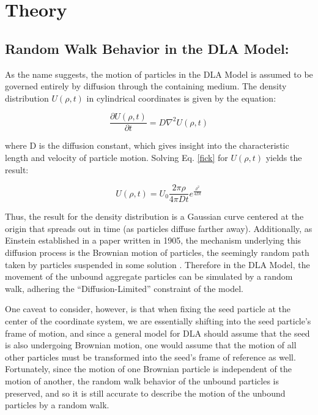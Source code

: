 \documentclass{article}
\begin{document}
 

\section{Theory}


\subsection{Random Walk Behavior in the DLA Model:}

As the name suggests, the motion of particles in the DLA Model is assumed to be governed entirely by diffusion through the containing medium. The density distribution $U(\rho,t)$ in cylindrical coordinates is given by the equation:

\begin{equation}
	\frac{\partial U(\rho,t)}{\partial t} = D \nabla^2 U(\rho,t) 
	\label{fick}
\end{equation}

where D is the diffusion constant, which gives insight into the characteristic length and velocity of particle motion. Solving Eq. \ref{fick} for $U(\rho,t)$ yields the result:

\begin{equation}
	U(\rho,t) = U_0 \frac{2 \pi \rho}{4 \pi Dt}e^{ \frac{\rho^2}{4Dt}}
	\label{gauss}
\end{equation}

\noindent Thus, the result for the density distribution is a Gaussian curve centered at the origin that spreads out in time (as particles diffuse farther away). Additionally, as Einstein established in a paper written in 1905, the mechanism underlying this diffusion process is the Brownian motion of particles, the seemingly random path taken by particles suspended in some solution \cite{einstein}. Therefore in the DLA Model, the movement of the unbound aggregate particles can be simulated by a random walk, adhering the ``Diffusion-Limited'' constraint of the model. 

One caveat to consider, however, is that when fixing the seed particle at the center of the coordinate system, we are essentially shifting into the seed particle's frame of motion, and since a general model for DLA should assume that the seed is also undergoing Brownian motion, one would assume that the motion of all other particles must be transformed into the seed's frame of reference as well. Fortunately, since the motion of one Brownian particle is independent of the motion of another, the random walk behavior of the unbound particles is preserved, and so it is still accurate to describe the motion of the unbound particles by a random walk.\\
\end{document}
